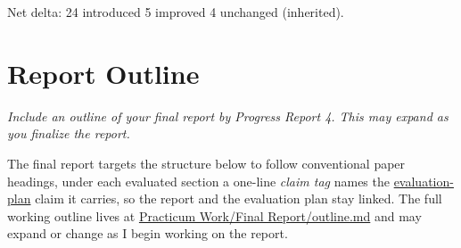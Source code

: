 \documentclass[12pt]{article}
\newcommand{\PRNumber}{5}
\newcommand{\RepoURL}{https://github.com/Ian-Costa18/Cybersecurity-Practicum/blob/progress-report-\PRNumber}
\newcommand{\instruction}[1]{{\small\itshape #1}}
\begin{document}
Net delta: 24 introduced \textperiodcentered{} 5 improved \textperiodcentered{} 4 unchanged (inherited).

\section*{Report Outline}

\instruction{Include an outline of your final report by Progress Report 4. This may expand as you finalize the report.}

The final report targets the structure below to follow conventional paper headings, under each evaluated section a one-line \emph{claim tag} names the \href{\RepoURL/docs/evaluation-plan.md}{evaluation-plan} claim it carries, so the report and the evaluation plan stay linked. The full working outline lives at \href{\RepoURL/Practicum\%20Work/Final\%20Report/outline.md}{Practicum Work/Final Report/outline.md} and may expand or change as I begin working on the report.
\end{document}
